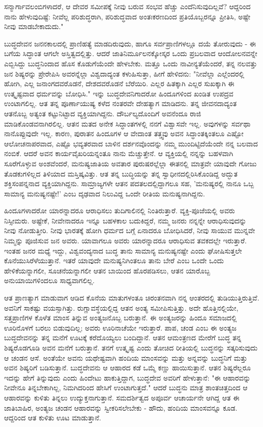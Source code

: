 ಸನ್ಮಾರ್ಗಾವಲಂಬಿಗಳಾದರೆ, ಆ ದೇವರ ಸಮೀಪಕ್ಕೆ ನೀವು ಬರುವ ಸಂಭವ ಹೆಚ್ಚು ಎಂದೆನಿಸುವುದಿಲ್ಲವೆ? ಆದ್ದರಿಂದ ನಾನು ಹೇಳುವುದಿಷ್ಟೆ: ನೀವೆಲ್ಲ ಪರಿಶುದ್ಧರಾಗಿ, ಪರಿಶುದ್ಧವಾದ ಅಂತಃಕರಣದಿಂದ ಪ್ರತಿಯೊಬ್ಬರನ್ನೂ ಪ್ರೀತಿಸಿ, ಅಷ್ಟೇ ನೀವು ಮಾಡಬೇಕಾದುದು."

ಬುದ್ಧದೇವನ ಜನನಕಾಲದಲ್ಲಿ ಪ್ರಾಣಿಹತ್ಯೆ ಮಾಡದಿರುವುದು, ಹಾಗೂ ಸರ್ವಪ್ರಾಣಿಗಳಲ್ಲೂ ದಯೆ ತೋರುವುದು - ಈ ಬಗೆಯ ಸಿದ್ಧಾಂತ ಆಗಲೇ ಅಸ್ತಿತ್ವದಲ್ಲಿತ್ತು. ಆದರೆ ಜಾತಿನಿರ್ಮೂಲನಕ್ಕೋಸ್ಕರ ಒಂದು ಪ್ರಬಲವಾದ ಆಂದೋಲನವನ್ನೇ ಎಬ್ಬಿಸಿದ್ದು ಬುದ್ಧನಿಂದಾದ ಹೊಸ ಕೊಡುಗೆಯೆಂದೇ ಹೇಳಬೇಕು. ಮತ್ತೂ ಒಂದು ನಾವೀನ್ಯತೆಯೆಂದರೆ, ತನ್ನ ನಲವತ್ತು ಜನ ಶಿಷ್ಯರನ್ನು ಪ್ರೇರೇಪಿಸಿ ಅವರನ್ನೆಲ್ಲಾ ವಿಶ್ವದಾದ್ಯಂತ ಕಳುಹಿಸುತ್ತಾ, ಹೀಗೆ ಹೇಳಿದನು: "ನೀವೆಲ್ಲಾ ಎಲ್ಲೆಂದರಲ್ಲಿ ಹೋಗಿ, ಎಲ್ಲ ಜನಾಂಗದವರೊಡನೆ, ದೇಶದವರೊಡನೆ ಬೆರೆಯಿರಿ. ಎಲ್ಲರ ಹಿತಕ್ಕಾಗಿ ಎಲ್ಲರ ಸುಖಕ್ಕಾಗಿ ಈ ಉತ್ಕೃಷ್ಟವಾದ ಧರ್ಮವನ್ನು ಬೋಧಿಸಿ." ಇನ್ನು ಬುದ್ಧದೇವನಿಗಾದರೋ ಹಿಂದೂಗಳಿಂದ ಖಂಡಿತ ಉಪದ್ರವ ಉಂಟಾಗಲಿಲ್ಲ. ಆತ ತನ್ನ ಪೂರ್ಣಾಯುಷ್ಯ ಕಳೆದ ನಂತರವೇ ದೇಹತ್ಯಾಗ ಮಾಡಿದನು. ತನ್ನ ಜೀವನದಾದ್ಯಂತ ಆತನೊಬ್ಬ ಅತ್ಯಂತ ಕಟ್ಟುನಿಟ್ಟಾದ ವ್ಯಕ್ತಿಯಾಗಿದ್ದನು. ದೌರ್ಬಲ್ಯದೊಂದಿಗೆ ಅವನೆಂದೂ ರಾಜಿ ಮಾಡಿಕೊಂಡವನಾಗಿರಲಿಲ್ಲ. ಆತನ ಮತದ ಅನೇಕ ಸಿದ್ಧಾಂತಗಳಲ್ಲಿ ನನಗೆ ವಿಶ್ವಾಸವೇ ಇಲ್ಲ. ಅವುಗಳನ್ನು ಸರ್ವಥಾ ನಾನೊಪ್ಪುವುದೇ ಇಲ್ಲ. ಕಾರಣ, ಪುರಾತನ ಹಿಂದೂಗಳ ಆ ವೇದಾಂತ ತತ್ತ್ವವು ಅವನ ಸಿದ್ಧಾಂತಕ್ಕಿಂತಲೂ ಎಷ್ಟೋ ಆಲೋಚನಾಪರವಾದ, ಎಷ್ಟೊ ಭವ್ಯತರವಾದ ಬಾಳಿನ ದರ್ಶನವೊಂದನ್ನು ನಮ್ಮ ಮುಂದಿಟ್ಟಿದೆಯೆಂದೇ ನನ್ನ ಬಲವಾದ ನಂಬಿಕೆ. ಆದರೆ ಅವನ ಕಾರ್ಯವೈಖರಿಯನ್ನಂತೂ ನಾನು ಮೆಚ್ಚುತ್ತೇನೆ. ಆ ವ್ಯಕ್ತಿಯಲ್ಲಿ ನನ್ನನ್ನು ಬಹಳವಾಗಿ ಸೂರೆಗೊಳ್ಳುವ ಅಂಶವೆಂದರೆ, ಮನುಷ್ಯಜಾತಿಯ ಅವತಾರ ಪುರುಷರಲ್ಲೆಲ್ಲಾ ಈತನಲ್ಲಿ ಮಾತ್ರವೇ ಯಾವುದೇ ಗೋಜು ತೊಡಕುಗಳಿಲ್ಲದ ತಿಳಿಯಾದ ಮಸ್ತಿಷ್ಕವಿತ್ತು. ಆತ ತನ್ನ ಬುದ್ಧಿಯನ್ನು ತನ್ನ ಸ್ವಾಧೀನದಲ್ಲಿರಿಸಿಕೊಂಡಿದ್ದ ಅದ್ಭುತ ಶಕ್ತಿಸಂಪನ್ನನಾದ ವ್ಯಕ್ತಿಯಾಗಿದ್ದನು. ಸಾಮ್ರಾಜ್ಯಗಳೇ ಆತನ ಪದತಲದಲ್ಲಿದ್ದಾಗಲೂ ಸಹ, 'ಮನುಷ್ಯರಲ್ಲಿ ನಾನೂ ಒಬ್ಬ ಸಾಮಾನ್ಯ ಮನುಷ್ಯನಷ್ಟೇ!' ಎಂಬ ದೃಢವಾದ ನಿಲುವಿದ್ದ ಒಂದೇ ರೀತಿಯ ಮನುಷ್ಯನಾಗಿದ್ದನು.

ಹಿಂದೂಗಳಾದರೋ ಯಾರನ್ನಾದರೂ ಆರಾಧಿಸಲು ತುದಿಗಾಲಿನಲ್ಲಿ ನಿಂತಿರುತ್ತಾರೆ. ವ್ಯಕ್ತಿ-ಪೂಜೆಯಲ್ಲಿ ಅವರು ನಿಸ್ಸೀಮರು. ಅಷ್ಟೇಕೆ, ನೀವೇನಾದರೂ ಇನ್ನೂ ಬಹಳಕಾಲ ಬದುಕಿದ್ದರೆ, ನಮ್ಮ ಜನರು ನನ್ನನ್ನೇ ಆರಾಧಿಸುವುದನ್ನು ನೀವು ನೋಡುತ್ತೀರಿ. ನೀವು ಭಾರತಕ್ಕೆ ಹೋಗಿ ಧರ್ಮದ ಬಗ್ಗೆ ಏನಾದರೂ ಬೋಧಿಸಿದರೆ, ನೀವು ಸಾಯುವ ಮುನ್ನವೇ ನಿಮ್ಮನ್ನು ಪೂಜಿಸುವ ಜನ ಅವರು. ಯಾವಾಗಲೂ ಅವರು ಯಾರನ್ನಾದರೂ ಆರಾಧಿಸುವ ತವಕದಲ್ಲೇ ಇರುತ್ತಾರೆ. ಇಂತಹ ಜನರ ಮಧ್ಯೆ ಇದ್ದು, ವಿಶ್ವವಂದ್ಯನಾದ ಬುದ್ಧ ತಾನು ಸಾಮಾನ್ಯ ಮನುಷ್ಯನಷ್ಟೇ ಎಂದು ಘೋಷಿಸುತ್ತಲೇ ಕೊನೆಯುಸಿರೆಳೆಯುತ್ತಾನೆ. ಇತರೆ ಯಾವುದೇ ಮನುಷ್ಯನಿಗಿಂತಲೂ ತಾನು ಬೇರೆ ಎಂಬ ಒಂದೇ ಒಂದು ಹೇಳಿಕೆಯನ್ನಾಗಲೀ, ಸೂಚನೆಯನ್ನಾಗಲೀ ಆತನ ಬಾಯಿಂದ ಹೊರಪಡಿಸಲು, ಆತನ ಯಾರೊಬ್ಬ ಅನುಯಾಯಿಗಳಿಂದಲೂ ಸಾಧ್ಯವಾಗಲಿಲ್ಲ.

ಆತ ಪ್ರಾಣತ್ಯಾಗ ಮಾಡುವಾಗ ಆಡಿದ ಕೊನೆಯ ಮಾತುಗಳಂತೂ ಚಿರಂತನವಾಗಿ ನನ್ನ ಆಂತರದಲ್ಲಿ ತುಡಿಯುತ್ತಿರುತ್ತಿವೆ. ಅವನಿಗೆ ಸಾಕಷ್ಟು ವಯಸ್ಸಾಗಿತ್ತು. ರುಗ್ಣಾವಸ್ಥೆಯಲ್ಲಿದ್ದ ಆತನ ಅಂತ್ಯ ಸಮೀಪಿಸುತ್ತಿತ್ತು. ಅದೇ ಹೊತ್ತಿನಲ್ಲಿಯೇ, ಸತ್ತಪ್ರಾಣಿಗಳ ಕೊಳೆತ ಮಾಂಸ ತಿನ್ನುವ ಅಂತ್ಯಜನೊಬ್ಬ ಬರುತ್ತಾನೆ. ಈ ಅಂತ್ಯಜರನ್ನು ಹಿಂದೂ ಸಮಾಜದಲ್ಲಿ ಊರಿನೊಳಗೆ ಬರಲು ಬಿಡುವುದಿಲ್ಲ; ಅವರು ಊರಿನಾಚೆಯೇ ಇರುತ್ತಾರೆ. ಪಾಪ, ಚಂಡ ಎಂಬ ಈ ಅಂತ್ಯಜ ಬುದ್ಧದೇವನನ್ನು ತನ್ನ ಮನೆಗೆ ಊಟಕ್ಕೆ ಕರೆದೊಯ್ಯಲು ಬಂದಿದ್ದಾನೆ. ಆತನ ಆಮಂತ್ರಣದ ಮೇರೆಗೆ ಬುದ್ಧ ತನ್ನ ಶಿಷ್ಯರೊಡಗೂಡಿ ಅವನ ಮನೆಗೆ ಬರುತ್ತಾನೆ. ತನಗೆ ಉತ್ಕೃಷ್ಟ ಎಂದು ತೋಚಿದ ರೀತಿಯಲ್ಲಿ ಬುದ್ಧನನ್ನು ಸತ್ಕರಿಸುವುದು ಆ ಚಂಡನ ಆಸೆ. ಅಂತೆಯೇ ಅವನು ಯಥೇಷ್ಟವಾಗಿ ಹಂದಿಯ ಮಾಂಸವನ್ನು ಮತ್ತು ಅನ್ನವನ್ನು ಬುದ್ಧನಿಗೆ ಮತ್ತು ಅವನ ಶಿಷ್ಯರಿಗೆ ಬಡಿಸುತ್ತಾನೆ. ಬುದ್ಧದೇವನು ಆ ಆಹಾರದ ಕಡೆ ಒಮ್ಮೆ ಕಣ್ಣು ಹಾಯಿಸುತ್ತಾನೆ. ಆತನ ಶಿಷ್ಯರೆಲ್ಲರೂ ಇದನ್ನು ಹೇಗೆ ತಿನ್ನುವುದು ಎಂದು ಹಿಂದೇಟು ಹಾಕುತ್ತಿದ್ದಾಗ, ಬುದ್ಧದೇವ ಅವರಿಗೆ ಹೇಳುತ್ತಾನೆ: "ಈ ಆಹಾರವನ್ನು ನೀವೇನೂ ತಿನ್ನಬೇಕಾಗಿಲ್ಲ, ನಿಮಗಿದರಿಂದ ಹೇಸಿಗೆ ಉಂಟಾಗುತ್ತದೆ." ಆದರೆ ಬುದ್ಧನು ಮಾತ್ರ ಶಾಂತಚಿತ್ತದಿಂದ ಆ ಆಹಾರವನ್ನು ಕುಳಿತು ತಿನ್ನಲು ಉದ್ಯುಕ್ತನಾಗುತ್ತಾನೆ. ಸಮದರ್ಶಿತ್ವದ ಅಪೂರ್ವ ಆಚಾರ್ಯನೇ ಆಗಿದ್ದ ಆತ ಈ ಜಾತಿಬಾಹಿರ, ಅಂತ್ಯಜ ಚಂಡನ ಆಹಾರವನ್ನು ಸ್ವೀಕರಿಸಲೇಬೇಕು - ಹೌದು, ಹಂದಿಯ ಮಾಂಸವನ್ನೂ ಕೂಡ. ಆದ್ದರಿಂದ ಆತ ಕುಳಿತು ಊಟ ಮಾಡುತ್ತಾನೆ.


